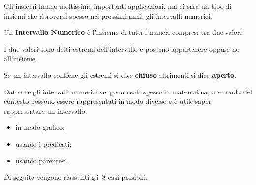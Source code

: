 {Gli insiemi hanno moltissime importanti applicazioni, ma ci sarà un tipo di 
insiemi che ritroverai spesso nei prossimi anni: gli intervalli numerici.

\begin{definizione}
Un \textbf{Intervallo Numerico} è l'insieme di tutti i numeri compresi tra 
due valori.

I due valori sono detti estremi dell'intervallo e possono appartenere 
oppure no all'insieme.
\end{definizione}

Se un intervallo contiene gli estremi si dice \textbf{chiuso} altrimenti si 
dice \textbf{aperto}.

Dato che gli intervalli numerici vengono usati spesso in matematica, a 
seconda del contesto possono essere rappresentati in modo diverso e è utile 
saper rappresentare un intervallo:\\ [-1.5em]
\begin{multicols}{3}
\begin{itemize} [nosep]
 \item in modo grafico;
 \item usando i predicati;
 \item usando parentesi.
\end{itemize}
\end{multicols}

Di seguito vengono riassunti gli~8 casi possibili.

}
